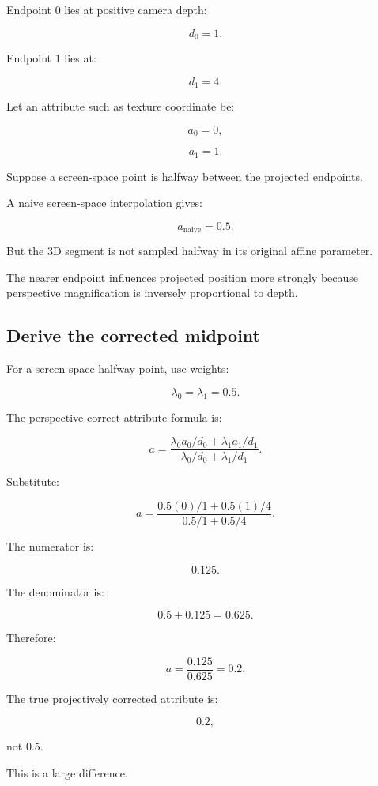 Endpoint 0 lies at positive camera depth:

\[
 d_0=1.
\]

Endpoint 1 lies at:

\[
 d_1=4.
\]

Let an attribute such as texture coordinate be:

\[
 a_0=0,
\]

\[
 a_1=1.
\]

Suppose a screen-space point is halfway between the projected endpoints.

A naive screen-space interpolation gives:

\[
 \boxed{ a_{\mathrm{naive}}=0.5 }.
\]

But the 3D segment is not sampled halfway in its original affine parameter.

The nearer endpoint influences projected position more strongly because perspective magnification is inversely proportional to depth.

\subsection{Derive the corrected midpoint}\label{02-foundations-ii-ch034-derive-the-corrected-midpoint}

\hypertarget{02-foundations-ii-ch034-derive-the-corrected-midpoint}{}

For a screen-space halfway point, use weights:

\[
 \lambda_0=\lambda_1=0.5.
\]

The perspective-correct attribute formula is:

\[
 a= \frac{ \lambda_0a_0/d_0+\lambda_1a_1/d_1 }{ \lambda_0/d_0+\lambda_1/d_1 }.
\]

Substitute:

\[
 a= \frac{ 0.5(0)/1+0.5(1)/4 }{ 0.5/1+0.5/4 }.
\]

The numerator is:

\[
 0.125.
\]

The denominator is:

\[
 0.5+0.125=0.625.
\]

Therefore:

\[
 \boxed{ a=\frac{0.125}{0.625}=0.2 }.
\]

The true projectively corrected attribute is:

\[
 \boxed{0.2},
\]

not \(0.5\).

This is a large difference.

